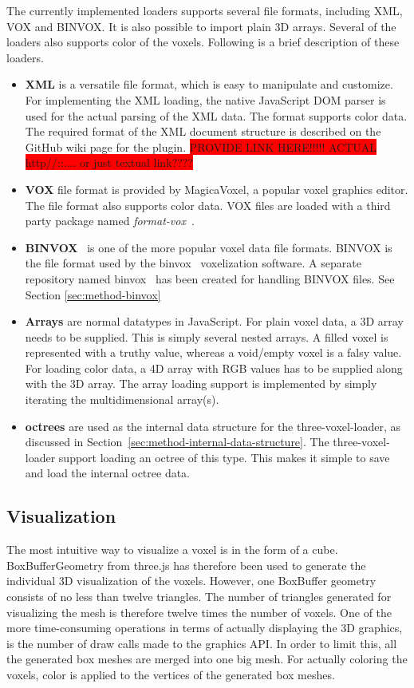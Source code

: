 The currently implemented loaders supports several file formats, including XML, VOX and BINVOX. It is also possible to import plain 3D arrays. Several of the loaders also supports color of the voxels. Following is a brief description of these loaders.
\begin{itemize}
    \item \textbf{XML} is a versatile file format, which is easy to manipulate and customize. For implementing the XML loading, the native JavaScript DOM parser is used for the actual parsing of the XML data. The format supports color data. The required format of the XML document structure is described on the GitHub wiki page for the plugin. \colorbox{red}{PROVIDE LINK HERE!!!!! ACTUAL http//::.... or just textual link????}
    \item \textbf{VOX} file format is provided by MagicaVoxel, a popular voxel graphics editor. The file format also supports color data. VOX files are loaded with a third party package named \textit{format-vox}~\cite{format-vox}.
    \item \textbf{BINVOX}~\cite{binvox-file-format} is one of the more popular voxel data file formats. BINVOX is the file format used by the binvox~\cite{binvox} voxelization software. A separate repository named binvox~\cite{andstor-binvox} has been created for handling BINVOX files. See Section \ref{sec:method-binvox}
    \item \textbf{Arrays} are normal datatypes in JavaScript. For plain voxel data, a 3D array needs to be supplied. This is simply several nested arrays. A filled voxel is represented with a truthy value, whereas a void/empty voxel is a falsy value. For loading color data, a 4D array with RGB values has to be supplied along with the 3D array. The array loading support is implemented by simply iterating the multidimensional array(s). 
    \item \textbf{octrees} are used as the internal data structure for the three-voxel-loader, as discussed in Section~\ref{sec:method-internal-data-structure}. The three-voxel-loader support loading an octree of this type. This makes it simple to save and load the internal octree data.
\end{itemize}

\subsection{Visualization}
The most intuitive way to visualize a voxel is in the form of a cube. BoxBufferGeometry from three.js has therefore been used to generate the individual 3D visualization of the voxels. However, one BoxBuffer geometry consists of no less than twelve triangles. The number of triangles generated for visualizing the mesh is therefore twelve times the number of voxels. One of the more time-consuming operations in terms of actually displaying the 3D graphics, is the number of draw calls made to the graphics API. In order to limit this, all the generated box meshes are merged into one big mesh. For actually coloring the voxels, color is applied to the vertices of the generated box meshes.

